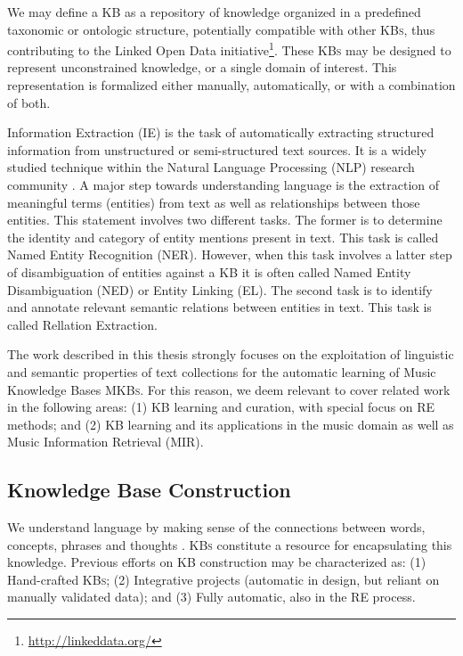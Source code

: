 We may define a \textsc{KB} as a repository of knowledge organized in a predefined taxonomic or ontologic structure, potentially compatible with other \textsc{KBs}, thus contributing to the Linked Open Data initiative\footnote{\url{http://linkeddata.org/}}. These \textsc{KBs} may be designed to represent unconstrained knowledge, or a single domain of interest. This representation is formalized either manually, automatically, or with a combination of both.

Information Extraction (IE) is the task of automatically extracting structured information from unstructured or semi-structured text sources. It is a widely studied technique within the Natural Language Processing (NLP) research community \cite{cowie1996information}.
A major step towards understanding language is the extraction of meaningful terms (entities) from text as well as relationships between those entities. This statement involves two different tasks. The former is to determine the identity and category of entity mentions present in text. This task is called Named Entity Recognition (NER). However, when this task involves a latter step of disambiguation of entities against a KB it is often called Named Entity Disambiguation (NED) or Entity Linking (EL). The second task is to identify and annotate relevant semantic relations between entities in text. This task is called Rellation Extraction.

The work described in this thesis strongly focuses on the exploitation of linguistic and semantic properties of text collections for the automatic learning of Music Knowledge Bases \textsc{MKBs}. For this reason, we deem relevant to cover related work in the following areas: (1) \textsc{KB} learning and curation, with special focus on \textsc{RE} methods; and (2) \textsc{KB} learning and its applications in the music domain as well as Music Information Retrieval (MIR).


\subsection{Knowledge Base Construction}
\label{sec:SOA:nlu:kbs}

We understand language by making sense of the connections between words, concepts, phrases and thoughts \citep{Havasietal2007}. \textsc{KBs} constitute a resource for encapsulating this knowledge. Previous efforts on \textsc{KB} construction may be characterized as: (1) Hand-crafted \textsc{KBs}; (2) Integrative projects (automatic in design, but reliant on manually validated data); and (3) Fully automatic, also in the \textsc{RE} process.

